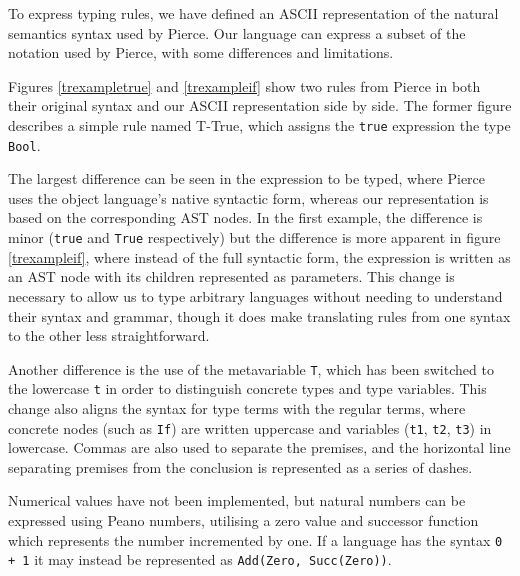 \documentclass[nofilelist]{cslthse-msc}
\begin{document}

To express typing rules, we have defined an ASCII representation of the natural semantics syntax used by Pierce\cite{pierce}.
Our language can express a subset of the notation used by Pierce, with some differences and limitations.

Figures \ref{trexampletrue} and \ref{trexampleif} show two rules from Pierce in both their original syntax and our ASCII representation side by side.
The former figure describes a simple rule named T-True, which assigns the \verb|true| expression the type \verb|Bool|.

The largest difference can be seen in the expression to be typed, where Pierce uses the object language's native syntactic form, whereas our representation is based on the corresponding AST nodes.
In the first example, the difference is minor (\verb|true| and \verb|True| respectively) but the difference is more apparent in figure \ref{trexampleif}, where instead of the full syntactic form, the expression is written as an AST node with its children represented as parameters.
This change is necessary to allow us to type arbitrary languages without needing to understand their syntax and grammar, though it does make translating rules from one syntax to the other less straightforward.

Another difference is the use of the metavariable \verb|T|, which has been switched to the lowercase \verb|t| in order to distinguish concrete types and type variables.
This change also aligns the syntax for type terms with the regular terms, where concrete nodes (such as \verb|If|) are written uppercase and variables (\verb|t1|, \verb|t2|, \verb|t3|) in lowercase.
Commas are also used to separate the premises, and the horizontal line separating premises from the conclusion is represented as a series of dashes.

Numerical values have not been implemented, but natural numbers can be expressed using Peano numbers\cite{peano}, utilising a zero value and successor function which represents the number incremented by one.
If a language has the syntax \verb|0 + 1| it may instead be represented as \verb|Add(Zero, Succ(Zero))|.
\end{document}

